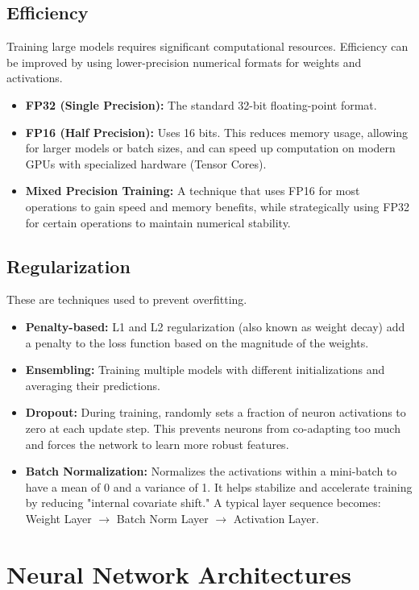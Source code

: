 \documentclass{article}
\begin{document}
\begin{multicols}{2}
\subsection{Efficiency}
Training large models requires significant computational resources. Efficiency can be improved by using lower-precision numerical formats for weights and activations.
\begin{itemize}
    \item \textbf{FP32 (Single Precision):} The standard 32-bit floating-point format.
    \item \textbf{FP16 (Half Precision):} Uses 16 bits. This reduces memory usage, allowing for larger models or batch sizes, and can speed up computation on modern GPUs with specialized hardware (Tensor Cores).
    \item \textbf{Mixed Precision Training:} A technique that uses FP16 for most operations to gain speed and memory benefits, while strategically using FP32 for certain operations to maintain numerical stability.
\end{itemize}

\subsection{Regularization}
These are techniques used to prevent overfitting.
\begin{itemize}
    \item \textbf{Penalty-based:} L1 and L2 regularization (also known as weight decay) add a penalty to the loss function based on the magnitude of the weights.
    \item \textbf{Ensembling:} Training multiple models with different initializations and averaging their predictions.
    \item \textbf{Dropout:} During training, randomly sets a fraction of neuron activations to zero at each update step. This prevents neurons from co-adapting too much and forces the network to learn more robust features.
    \item \textbf{Batch Normalization:} Normalizes the activations within a mini-batch to have a mean of 0 and a variance of 1. It helps stabilize and accelerate training by reducing "internal covariate shift." A typical layer sequence becomes: Weight Layer $\rightarrow$ Batch Norm Layer $\rightarrow$ Activation Layer.
\end{itemize}

\section{Neural Network Architectures}

\end{multicols}
\end{document}
